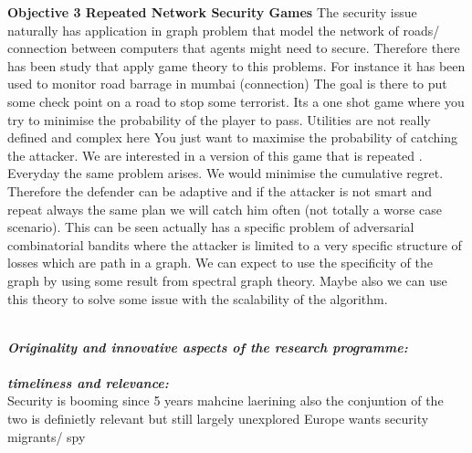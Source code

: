 \textbf{Objective 3 Repeated Network Security Games}
The security issue naturally has application in graph problem that model the network of roads/ connection between computers that agents might need to secure. Therefore there has been study that apply game theory to this problems. For instance it has been used to monitor road barrage in mumbai (connection) The goal is there to put some check point on a road to stop some terrorist. Its a one shot game where you try to minimise the probability of the player to pass.  Utilities are not really defined and complex here You just want to maximise the probability of catching the attacker. We are interested in a version of this game that is repeated . Everyday the same problem arises. We would minimise the cumulative regret. Therefore the defender can be adaptive and if the attacker is not smart and repeat always the same plan we will catch him often (not totally a worse case scenario). This can be seen actually has a specific problem of adversarial combinatorial bandits where the  attacker is limited to a very specific structure of losses which are path in a graph. We can expect to use the specificity of the graph by using some result from spectral graph theory. Maybe also we can use this theory to solve some issue with the scalability of the algorithm.



\noindent \textbf{\textit{\\Originality and innovative aspects of the research programme:}}\\

 
\noindent \textbf{\textit{\\timeliness and relevance:}}\\
Security is booming since 5 years
mahcine laerining also
the conjuntion of the two is definietly relevant but still largely unexplored
Europe wants security
migrants/ spy
 